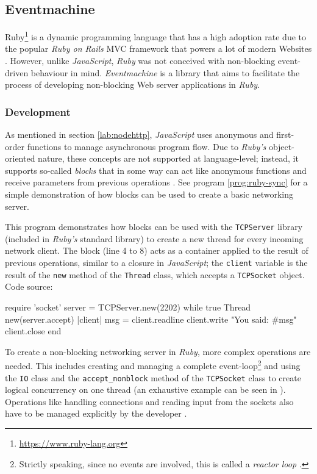 \subsection{Eventmachine}
\label{sec:eventmachine}
Ruby\footnote{\url{https://www.ruby-lang.org}} is a dynamic programming language that has a high adoption rate due to the popular \textit{Ruby on Rails} MVC framework that powers a lot of modern Websites \cite[p. 11]{Orsini2008}. However, unlike \textit{JavaScript}, \textit{Ruby} was not conceived with non-blocking event-driven behaviour in mind. \textit{Eventmachine} is a library that aims to facilitate the process of developing non-blocking Web server applications in \textit{Ruby}.

\subsubsection*{Development}
As mentioned in section \ref{lab:nodehttp}, \textit{JavaScript} uses anonymous and first-order functions to manage asynchronous program flow. Due to \textit{Ruby's} object-oriented nature, these concepts are not supported at language-level; instead, it supports so-called \textit{blocks} that in some way can act like anonymous functions and receive parameters from previous operations \cite{Fitzgerald2007}. See program \ref{prog:ruby-sync} for a simple demonstration of how blocks can be used to create a basic networking server.

\begin{program}
  \caption{This program demonstrates how blocks can be used with the \texttt{TCPServer} library (included in \textit{Ruby's} standard library) to create a new thread for every incoming network client. The block (line 4 to 8) acts as a container applied to the result of previous operations, similar to a closure in \textit{JavaScript}; the \texttt{client} variable is the result of the \texttt{new} method of the \texttt{Thread} class, which accepts a \texttt{TCPSocket} object. Code source: \cite {Gupta2010}}
  \label{prog:ruby-sync}
  \begin{JavaCode}
require 'socket'
server = TCPServer.new(2202)
while true
    Thread new(server.accept){ |client|
        msg = client.readline
        client.write "You said: #{msg}"
        client.close
    }
end
  \end{JavaCode}
\end{program}

To create a non-blocking networking server in \textit{Ruby}, more complex operations are needed. This includes creating and managing a complete event-loop\footnote{Strictly speaking, since no events are involved, this is called a \textit{reactor loop} \cite{Gupta2010}.} and using the \texttt{IO} class and the \texttt{accept\_nonblock} method of the \texttt{TCPSocket} class to create logical concurrency on one thread (an exhaustive example can be seen in \cite{Gupta2010}). Operations like handling connections and reading input from the sockets also have to be managed explicitly by the developer \cite{Gupta2010}.

